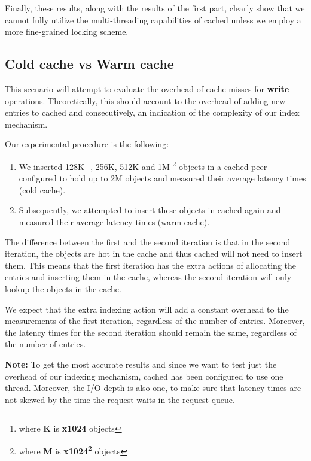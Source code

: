 Finally, these results, along with the results of the first part, clearly show 
that we cannot fully utilize the multi-threading capabilities of cached unless 
we employ a more fine-grained locking scheme.

\subsection{Cold cache vs Warm cache}

This scenario will attempt to evaluate the overhead of cache misses for 
\textbf{write} operations. Theoretically, this should account to the overhead 
of adding new entries to cached and consecutively, an indication of the 
complexity of our index mechanism.

Our experimental procedure is the following:

\begin{enumerate}
	\item We inserted 128K
		\footnote{where \textbf{K} is \textbf{x1024} objects}, 256K, 512K and 
		1M
		\footnote{where \textbf{M} is \textbf{x1024\textsuperscript{2}} 
			objects}
		objects in a cached peer configured to hold up to 2M objects 
		and measured their average latency times (cold cache).
	\item Subsequently, we attempted to insert these objects in cached 
		again and measured their average latency times (warm cache).
\end{enumerate}

The difference between the first and the second iteration is that in the second 
iteration, the objects are hot in the cache and thus cached will not need to 
insert them. This means that the first iteration has the extra actions of 
allocating the entries and inserting them in the cache, whereas the second 
iteration will only lookup the objects in the cache.

We expect that the extra indexing action will add a constant overhead to the 
measurements of the first iteration, regardless of the number of entries.
Moreover, the latency times for the second iteration should remain the same, 
regardless of the number of entries.

\textbf{Note:} To get the most accurate results and since we want to test just 
the overhead of our indexing mechanism, cached has been configured to use one 
thread.  Moreover, the I/O depth is also one, to make sure that latency times 
are not skewed by the time the request waits in the request queue.


